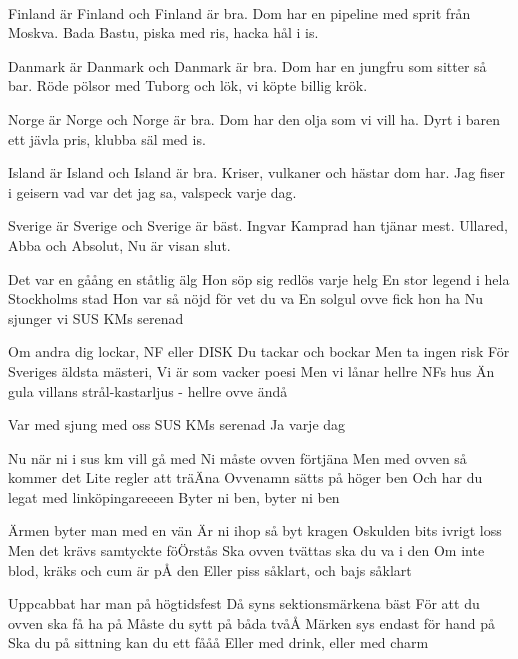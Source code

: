 


 \\       

\songtext{}Finland är Finland och Finland är bra.
Dom har en pipeline med sprit från Moskva.
Bada Bastu, piska med ris,
hacka hål i is.

Danmark är Danmark och Danmark är bra.
Dom har en jungfru som sitter så bar.
Röde pölsor med Tuborg och lök,
vi köpte billig krök.

Norge är Norge och Norge är bra.
Dom har den olja som vi vill ha.
Dyrt i baren ett jävla pris,
klubba säl med is.

Island är Island och Island är bra.
Kriser, vulkaner och hästar dom har.
Jag fiser i geisern vad var det jag sa, valspeck varje dag.

Sverige är Sverige och Sverige är bäst.
Ingvar Kamprad han tjänar mest.
Ullared, Abba och Absolut,
Nu är visan slut.



\author{Text: Mozart}

\songtext{}Det var en gåång en ståtlig älg
Hon söp sig redlös varje helg
En stor legend i hela Stockholms stad
Hon var så nöjd för vet du va
En solgul ovve fick hon ha
Nu sjunger vi SUS KMs serenad

Om andra dig lockar,
NF eller DISK
Du tackar och bockar
Men ta ingen risk
För Sveriges äldsta mästeri,
Vi är som vacker poesi
Men vi lånar hellre NFs hus
Än gula villans strål-kastarljus
- hellre ovve ändå

Var med sjung med oss
SUS KMs serenad
Ja varje dag


\author{Text: Kirre, Åland & Bombay}

\songtext{}Nu när ni i sus km vill gå med
Ni måste ovven förtjäna
Men med ovven så kommer det
Lite regler att träÄna
Ovvenamn sätts på höger ben
Och har du legat med linköpingareeeen
Byter ni ben, byter ni ben

Ärmen byter man med en vän
Är ni ihop så byt kragen
Oskulden bits ivrigt loss
Men det krävs samtyckte föÖrstås
Ska ovven tvättas ska du va i den
Om inte blod, kräks och cum är pÅ den
Eller piss såklart, och bajs såklart

Uppcabbat har man på högtidsfest
Då syns sektionsmärkena bäst
För att du ovven ska få ha på
Måste du sytt på båda tvåÅ
Märken sys endast för hand på
Ska du på sittning kan du ett fååå
Eller med drink, eller med charm

